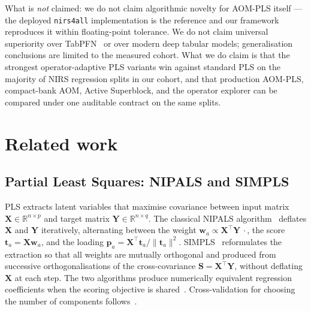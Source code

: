 \documentclass[review,a4paper]{elsarticle}
\newcommand{\R}{\mathbb{R}}
\newcommand{\Xmat}{\mathbf{X}}
\newcommand{\Ymat}{\mathbf{Y}}
\newcommand{\Smat}{\mathbf{S}}
\newcommand{\wvec}{\mathbf{w}}
\newcommand{\tvec}{\mathbf{t}}
\newcommand{\pvec}{\mathbf{p}}
\newcommand{\AOM}{\textsc{AOM}\xspace}
\newcommand{\PLS}{\textsc{PLS}\xspace}
\newcommand{\NIPALS}{\textsc{NIPALS}\xspace}
\newcommand{\SIMPLS}{\textsc{SIMPLS}\xspace}
\newcommand{\nirsfourall}{\texttt{nirs4all}\xspace}
\begin{document}
What is \emph{not} claimed: we do not claim algorithmic novelty for
\AOM-\PLS itself --- the deployed \nirsfourall implementation is the
reference and our framework reproduces it within floating-point
tolerance. We do not claim
universal superiority over TabPFN~\cite{hollmann2025tabpfn,
grinsztajn2025tabpfn25} or over modern deep tabular models;
generalisation conclusions are limited to the measured cohort. What we
do claim is that the strongest operator-adaptive \PLS variants win
against standard \PLS on the majority of NIRS regression splits in our
cohort, and that production \AOM-\PLS, compact-bank \AOM, Active
Superblock, and the operator explorer can be compared under one
auditable contract on the same splits.

\section{Related work}\label{sec:related}

\subsection{Partial Least Squares: \NIPALS and \SIMPLS}
\PLS extracts latent variables that maximise covariance between
input matrix $\Xmat\in\R^{n\times p}$ and target matrix
$\Ymat\in\R^{n\times q}$. The classical \NIPALS
algorithm~\cite{wold1975soft, geladi1986partial, wold2001pls}
deflates $\Xmat$ and $\Ymat$ iteratively, alternating between the
weight $\wvec_a\propto \Xmat^\top \Ymat\,\cdot$, the score
$\tvec_a=\Xmat\wvec_a$, and the loading
$\pvec_a=\Xmat^\top \tvec_a/\|\tvec_a\|^2$. \SIMPLS~\cite{dejong1993simpls}
reformulates the extraction so that all weights are mutually orthogonal
and produced from successive orthogonalisations of the cross-covariance
$\Smat=\Xmat^\top \Ymat$, without deflating $\Xmat$ at each step. The
two algorithms produce numerically equivalent regression coefficients
when the scoring objective is shared~\cite{dejong1993simpls,
martens2001reliable, martens1989multivariate}. Cross-validation for
choosing the number of components follows~\cite{wold1978cross,
krzanowski1987cv}.
\end{document}
